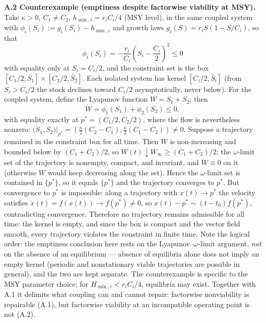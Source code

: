 \documentclass[11pt]{article}
\theoremstyle{definition}
\begin{document}
\textbf{A.2 Counterexample (emptiness despite factorwise viability at
MSY).} Take \(\kappa > 0\), \(C_1 \ne C_2\), \(h_{\min,i} = r_i C_i / 4\) (MSY level), in the same coupled system with \(\phi_i(S_i) := g_i(S_i) - h_{\min,i}\) and growth laws
\(g_i(S) = r_i S (1 - S/C_i)\), so that
\[\phi_i(S_i) = -\frac{r_i}{C_i}\left(S_i - \frac{C_i}{2}\right)^2 \le 0\]
with equality only at \(S_i = C_i/2\), and the constraint set is the box \([C_1/2, \bar S_1] \times [C_2/2, \bar S_2]\). Each isolated system has kernel \([C_i/2, \bar S_i]\) (from \(S_i > C_i/2\) the stock
declines toward \(C_i/2\) asymptotically, never below). For the coupled
system, define the Lyapunov function \(W = S_1 + S_2\); then
\[\dot W = \phi_1(S_1) + \phi_2(S_2) \le 0,\] with equality exactly at
\(p^* = (C_1/2, C_2/2)\), where the flow is nevertheless nonzero:
\(\big(\dot S_1, \dot S_2\big)\big|_{p^*} = \left(\tfrac{\kappa}{2}(C_2 - C_1), \tfrac{\kappa}{2}(C_1 - C_2)\right) \ne 0.\)
Suppose a trajectory remained in the constraint box for all time. Then
\(W\) is non-increasing and bounded below by \((C_1 + C_2)/2\), so
\(W(t) \downarrow W_\infty \ge (C_1 + C_2)/2\); the \(\omega\)-limit set
of the trajectory is nonempty, compact, and invariant, and
\(\dot W \equiv 0\) on it (otherwise \(W\) would keep decreasing along
the set). Hence the \(\omega\)-limit set is contained in \(\{p^*\}\), so
it equals \(\{p^*\}\) and the trajectory converges to \(p^*\). But
convergence to \(p^*\) is impossible: along a trajectory with
\(x(t) \to p^*\) the velocity satisfies
\(\dot x(t) = f(x(t)) \to f(p^*) \ne 0\), so
\(x(t) - p^* \sim (t - t_0) f(p^*)\), contradicting convergence.
Therefore no trajectory remains admissible for all time: the kernel is
empty, and since the box is compact and the vector field smooth, every
trajectory violates the constraint in finite time. Note the logical
order: the emptiness conclusion here rests on the
Lyapunov--\(\omega\)-limit argument, \emph{not} on the absence of an
equilibrium --- absence of equilibria alone does not imply an empty
kernel (periodic and nonstationary viable trajectories are possible in
general), and the two are kept separate. The counterexample is
specific to the MSY parameter choice; for \(H_{\min,i} < r_i C_i / 4\),
equilibria may exist. Together with A.1 it delimits what coupling can
and cannot repair: factorwise nonviability is repairable (A.1), but
factorwise viability at an incompatible operating point is not (A.2).
\end{document}

